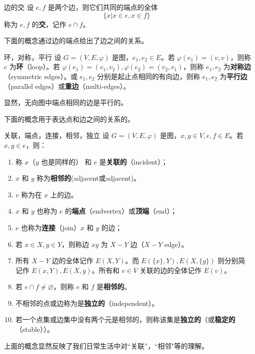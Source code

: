 \begin{definition}{边的交}
设 $e,f$ 是两个边，则它们共同的端点的全体
\begin{equation}
\{x|x\in e,x\in f\}~
\end{equation}
称为 $e,f$ 的\textbf{交}，记作 $e\cap f$。
\end{definition}

下面的概念通过边的端点给出了边之间的关系。
\begin{definition}{环，对称，平行}
设 $G=(V,E,\varphi)$ 是图，$e_1,e_2\in E$。若 $\varphi(e_1)=(v,v)$，则称 $e$ 为\textbf{环}（loop）。若 $\varphi(e_1)=(v_1,v_2),\varphi(e_2)=(v_2,v_1)$，则称 $e_1,e_2$ 为\textbf{对称边}（symmetric edges）。或 $e_1,e_2$ 分别是起止点相同的有向边，则称 $e_1,e_2$ 为\textbf{平行边}（parallel edges）或\textbf{重边}（multi-edges）。
\end{definition}
显然，无向图中端点相同的边是平行的。

下面的概念用于表达点和边之间的关系的。
\begin{definition}{关联，端点，连接，相邻，独立}
设 $G=(V,E,\varphi)$ 是图，$x,y\in V,e,f\in E$。若 $x,y\in e$，则：

 \begin{enumerate}
 \item 称 $x$（$y$ 也是同样的） 和 $e$ 是\textbf{关联的}（incident）；

   \item  $x$ 和 $y$ 称为\textbf{相邻的}(adjacent或adjacent)。

   \item $v$ 称为在 $x$ 上的边。
  
   \item $x$ 和 $y$ 也称为 $e$ 的\textbf{端点}（endvertex）或\textbf{顶端}（end）；
  
  \item  $e$ 也称为\textbf{连接}（join）$x$ 和 $y$ 的边；
  
   \item 若 $x\in X,y\in Y$，则称边 $xy$ 为 $X-Y$ 边（$X-Y$ edge）。
  
   \item 所有 $X-Y$ 边的全体记作 $E(X,Y)$。而 $E(\{x\},Y),E(X,\{y\})$ 则分别简记作 $E(x,Y),E(X,y)$。所有和 $v\in V$ 关联的边的全体记作 $E(v)$。

   \item 若 $e\cap f\neq\varnothing$，则称 $e$ 和 $f$ 是\textbf{相邻的}。

   \item 不相邻的点或边称为是\textbf{独立的}（independent）。
   
   \item 若一个点集或边集中没有两个元是相邻的，则称该集是\textbf{独立的}（或\textbf{稳定的}（stable））。
 \end{enumerate}
\end{definition}
上面的概念显然反映了我们日常生活中对“关联”，“相邻"等的理解。

